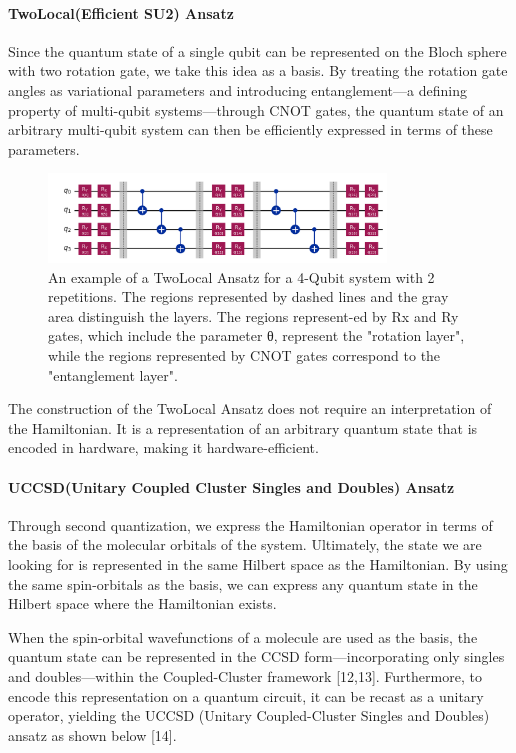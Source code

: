 \documentclass[pdflatex,sn-mathphys-num]{sn-jnl}%
\theoremstyle{thmstyleone}%
\theoremstyle{thmstyletwo}%
\theoremstyle{thmstylethree}%
\begin{document}
\paragraph{TwoLocal(Efficient SU2) Ansatz} \leavevmode \newline
Since the quantum state of a single qubit can be represented on the Bloch sphere with two rotation gate, we take this idea as a basis. 
By treating the rotation gate angles as variational parameters and introducing entanglement—a defining property of multi-qubit systems—through CNOT gates, 
the quantum state of an arbitrary multi-qubit system can then be efficiently expressed in terms of these parameters.

\begin{figure}[htbp]
\centering
\includegraphics[width=0.8\textwidth]{fig/twolocal.png}
\caption{An example of a TwoLocal Ansatz for a 4-Qubit system with 2 repetitions. The regions represented by dashed lines and the gray area distinguish the layers. The regions represent-ed by Rx and Ry gates, which include the parameter θ, represent the "rotation layer", while the regions represented by CNOT gates correspond to the "entanglement layer".}\label{Fig.3}
\end{figure}
The construction of the TwoLocal Ansatz does not require an interpretation of the Hamiltonian. It is a representation of an arbitrary quantum state that is encoded in hardware, making it hardware-efficient.

\paragraph{UCCSD(Unitary Coupled Cluster Singles and Doubles) Ansatz} \leavevmode \newline
Through second quantization, we express the Hamiltonian operator in terms of the basis of the molecular orbitals of the system. Ultimately, 
the state we are looking for is represented in the same Hilbert space as the Hamiltonian. By using the same spin-orbitals as the basis, 
we can express any quantum state in the Hilbert space where the Hamiltonian exists. 

When the spin-orbital wavefunctions of a molecule are used as the basis, the quantum state can be represented in the CCSD form—incorporating only singles and doubles—within the Coupled-Cluster framework [12,13]. Furthermore, to encode this representation on a quantum circuit, it can be recast as a unitary operator, yielding the UCCSD (Unitary Coupled-Cluster Singles and Doubles) ansatz as shown below [14].
\end{document}
